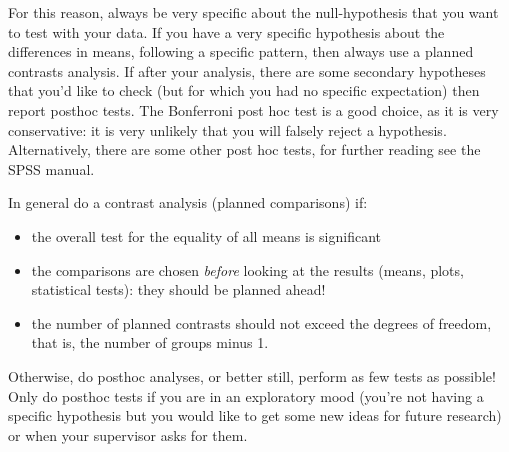 \documentclass[]{book}\usepackage[]{graphicx}\usepackage[]{color}
\begin{document}
For this reason, always be very specific about the null-hypothesis that you want to test with your data. If you have a very specific hypothesis about the differences in means, following a specific pattern, then always use a planned contrasts analysis. If after your analysis, there are some secondary hypotheses that you'd like to check (but for which you had no specific expectation) then report posthoc tests. The Bonferroni post hoc test is a good choice, as it is very conservative: it is very unlikely that you will falsely reject a hypothesis. Alternatively, there are some other post hoc tests, for further reading see the SPSS manual.

In general do a contrast analysis (planned comparisons) if:


\begin{itemize}
\item the overall test for the equality of all means is significant
\item the comparisons are chosen \textit{before} looking at the results (means, plots, statistical tests): they should be planned ahead!
\item the number of planned contrasts should not exceed the degrees of freedom, that is, the number of groups minus 1. 
\end{itemize}


Otherwise, do posthoc analyses, or better still, perform as few tests as possible! Only do posthoc tests if you are in an exploratory mood (you're not having a specific hypothesis but you would like to get some new ideas for future research) or when your supervisor asks for them.
\end{document}
